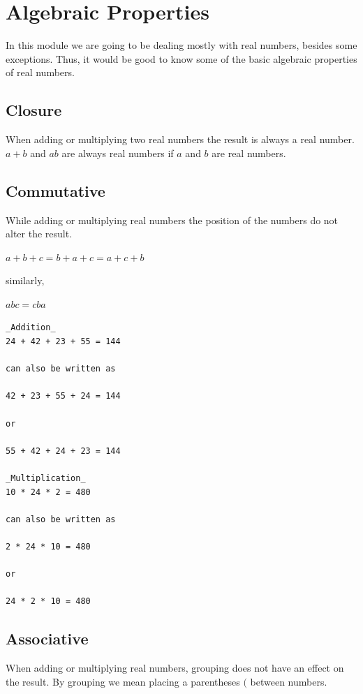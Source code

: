 \documentclass[
]{book}
\begin{document}
\hypertarget{algebraic-properties}{%
\section{Algebraic Properties}\label{algebraic-properties}}

In this module we are going to be dealing mostly with real numbers, besides some exceptions. Thus, it would be good to know some of the basic algebraic properties of real numbers.

\hypertarget{closure}{%
\subsection{Closure}\label{closure}}

When adding or multiplying two real numbers the result is always a real number.
\(a + b\) and \(ab\) are always real numbers if \(a\) and \(b\) are real numbers.

\hypertarget{commutative}{%
\subsection{Commutative}\label{commutative}}

While adding or multiplying real numbers the position of the numbers do not alter the result.

\(a + b + c = b + a + c = a + c + b\)

similarly,

\(abc = cba\)

\begin{verbatim}
_Addition_
24 + 42 + 23 + 55 = 144   

can also be written as

42 + 23 + 55 + 24 = 144   

or

55 + 42 + 24 + 23 = 144   

_Multiplication_
10 * 24 * 2 = 480

can also be written as

2 * 24 * 10 = 480

or

24 * 2 * 10 = 480
\end{verbatim}

\hypertarget{associative}{%
\subsection{Associative}\label{associative}}

When adding or multiplying real numbers, grouping does not have an effect on the result. By grouping we mean placing a parentheses \((\) between numbers.
\end{document}
